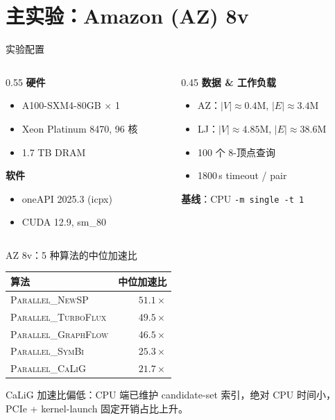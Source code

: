 \documentclass[aspectratio=169,10pt]{beamer}
\begin{document}
\section{主实验：Amazon (AZ) 8v}
\begin{frame}{实验配置}
  \begin{columns}
  \begin{column}{0.55\textwidth}
    \textbf{硬件}
    \begin{itemize}
      \item A100-SXM4-80GB $\times$ 1
      \item Xeon Platinum 8470, 96 核
      \item 1.7 TB DRAM
    \end{itemize}
    \textbf{软件}
    \begin{itemize}
      \item oneAPI 2025.3 (icpx)
      \item CUDA 12.9, sm\_80
    \end{itemize}
  \end{column}
  \begin{column}{0.45\textwidth}
    \textbf{数据 \& 工作负载}
    \begin{itemize}
      \item AZ：$|V|\!\approx\!0.4$M, $|E|\!\approx\!3.4$M
      \item LJ：$|V|\!\approx\!4.85$M, $|E|\!\approx\!38.6$M
      \item 100 个 8-顶点查询
      \item 1800\,s timeout / pair
    \end{itemize}
    \textbf{基线}：CPU \texttt{-m single -t 1}
  \end{column}
  \end{columns}
\end{frame}

\begin{frame}{AZ 8v：5 种算法的中位加速比}
  \centering
  \begin{tabular}{lr}
    \toprule
    \textbf{算法} & \textbf{中位加速比} \\
    \midrule
    \textsc{Parallel\_NewSP}      & $\mathbf{51.1\times}$ \\
    \textsc{Parallel\_TurboFlux}  & $49.5\times$ \\
    \textsc{Parallel\_GraphFlow}  & $46.5\times$ \\
    \textsc{Parallel\_SymBi}      & $25.3\times$ \\
    \textsc{Parallel\_CaLiG}      & $21.7\times$ \\
    \bottomrule
  \end{tabular}
  \vfill
  \footnotesize
  CaLiG 加速比偏低：CPU 端已维护 candidate-set 索引，绝对 CPU 时间小，PCIe + kernel-launch 固定开销占比上升。
\end{frame}
\end{document}
